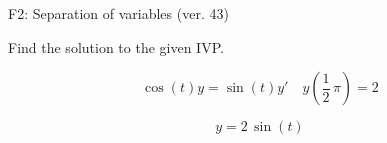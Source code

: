 \begin{exercise}
  \begin{exerciseTitle}F2: Separation of variables (ver. 43)\end{exerciseTitle}
  \begin{exerciseStatement}
    
Find the solution to the given IVP.

    
\[\cos\left(t\right) y= \sin\left(t\right) y'\hspace{1em} y\left( \frac{1}{2} \, \pi \right)= 2\]

  \end{exerciseStatement}
  \begin{exerciseAnswer}
    
\[y= 2 \, \sin\left(t\right)\]

  \end{exerciseAnswer}
\end{exercise}